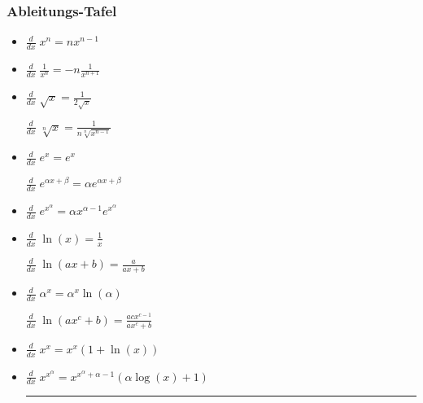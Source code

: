 \subsubsection{Ableitungs-Tafel}
\begin{itemize}[leftmargin=*]
	\item $\frac{d}{dx}\; x^n = nx^{n-1}$
	\item $\frac{d}{dx}\; \frac{1}{x^n} = -n \frac{1}{x^{n+1}}$
	
	\item 
	\begin{minipage}{0.4\columnwidth}
		$\frac{d}{dx}\; \sqrt{x} = \frac{1}{2\sqrt{x}}$
	\end{minipage}
	\begin{minipage}{0.55\columnwidth}
		$\frac{d}{dx}\; \sqrt[n]{x} = \frac{1}{n\sqrt[n]{x^{n-1}}}$
	\end{minipage}
	
	\item
	\begin{minipage}{0.4\columnwidth}
		$\frac{d}{dx}\; e^x = e^x$
	\end{minipage}
	\begin{minipage}{0.55\columnwidth}
		$\frac{d}{dx}\; e^{\alpha x + \beta} = \alpha e^{\alpha x + \beta}$
	\end{minipage}
	
	\item $\frac{d}{dx}\; e^{x^\alpha} = \alpha x^{\alpha - 1} e^{x^\alpha}$


	\item 
		\begin{minipage}{0.4\columnwidth}
			$\frac{d}{dx}\; \ln(x) = \frac{1}{x}$
		\end{minipage}
		\begin{minipage}{0.55\columnwidth}
			$\frac{d}{dx}\; \ln(ax + b) = \frac{a}{ax+b}$
		\end{minipage}
	\item 
		\begin{minipage}{0.4\columnwidth}
			$\frac{d}{dx}\; \alpha^x = \alpha^x \ln(\alpha)$
		\end{minipage}
		\begin{minipage}{0.55\columnwidth}
			$\frac{d}{dx}\; \ln(ax^c + b) = \frac{acx^{c-1}}{ax^c+b}$
		\end{minipage}
	\item $\frac{d}{dx}\; x^x = x^x (1 + \ln(x))$
	\item $\frac{d}{dx}\; x^{x^\alpha} = x^{x^\alpha + \alpha - 1} (\alpha \log(x) + 1)$ 
	\vspace{0.1cm}\hrule


\end{itemize}
